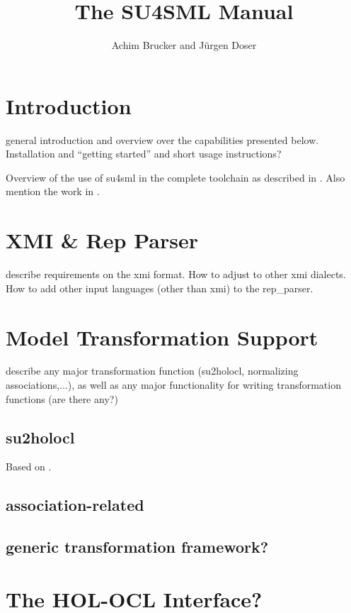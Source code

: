\documentclass[bibtotoc,liststotoc]{scrbook}
\begin{document}
\title{The SU4SML Manual}
\author{Achim Brucker and Jürgen Doser}
\maketitle

\tableofcontents
\chapter{Introduction}

general introduction and overview over the capabilities presented
below. Installation and ``getting started'' and short usage
instructions?  

Overview of the use of su4sml in the complete toolchain as described
in \cite{brucker.ea:mda:2006-b}.  Also mention the work in
\cite{marcel.beer:sa:2006,beer:generic:2007,brucker.ea:mda:2006-b}.
 
\chapter{XMI \& Rep Parser}

describe requirements on the xmi format. How to adjust to other xmi
dialects. How to add other input languages (other than xmi) to the
rep\_parser. 

\chapter{Model Transformation Support}

describe any major transformation function (su2holocl, normalizing
associations,...), as well as any major functionality for writing
transformation functions (are there any?)  

\section{su2holocl}

Based on \cite{crijke:transforming:2006}.

\section{association-related}

\section{generic transformation framework?}

\chapter{The HOL-OCL Interface?}
\end{document}
